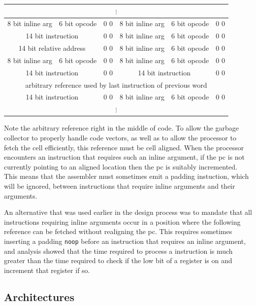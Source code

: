 \begin{center}
\begin{tabular}{|c|c|c|c|c|c|}
\multicolumn{6}{|c|}{$\vdots$}\\\hline
8 bit inline arg & 6 bit opcode & 0 0 &
8 bit inline arg & 6 bit opcode & 0 0 \\\hline
\multicolumn{2}{|c|}{14 bit instruction} & 0 0 &
8 bit inline arg & 6 bit opcode & 0 0 \\\hline
\multicolumn{2}{|c|}{14 bit relative address} & 0 0 &
8 bit inline arg & 6 bit opcode & 0 0 \\\hline
8 bit inline arg & 6 bit opcode & 0 0 &
8 bit inline arg & 6 bit opcode & 0 0 \\\hline
\multicolumn{2}{|c|}{14 bit instruction} & 0 0 &
\multicolumn{2}{c|}{14 bit instruction} & 0 0 \\\hline
\multicolumn{6}{|c|}{arbitrary reference used by last instruction of
 previous word} \\\hline
\multicolumn{2}{|c|}{14 bit instruction} & 0 0 &
8 bit inline arg & 6 bit opcode & 0 0 \\\hline
\multicolumn{6}{|c|}{$\vdots$}
\end{tabular}
\end{center}

Note the arbitrary reference right in the middle of code.  To allow
the garbage collector to properly handle code vectors, as well as to
allow the processor to fetch the cell efficiently, this reference must
be cell aligned.  When the processor encounters an instruction that
requires such an inline argument, if the pc is not currently pointing
to an aligned location then the pc is suitably incremented.  This
means that the assembler must sometimes emit a padding instuction,
which will be ignored, between instructions that require inline
arguments and their arguments.

An alternative that was used earlier in the design process was to
mandate that all instructions requiring inline arguments occur in a
position where the following reference can be fetched without
realigning the pc.  This requires sometimes inserting a padding
\texttt{noop} before an instruction that requires an inline argument,
and
analysis showed that the time required to process a 
instruction is much greater than the time required to check if the low
bit of a register is on and increment that register if so.


\subsection{Architectures} \label{sec:architectures}


